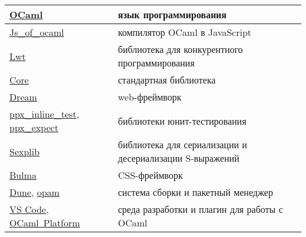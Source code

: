 \begin{centering}
\begin{longtable}{|l|p{8cm}|}
            \href{https://ocaml.org/}{OCaml}                                                                                                                    & язык программирования                                    \\ \hline
            \href{http://ocsigen.org/js_of_ocaml/}{Js\_of\_ocaml}                                                                                               & компилятор OCaml в JavaScript                            \\ \hline
            \href{https://ocsigen.org/lwt/}{Lwt}                                                                                                                & библиотека для конкурентного программирования            \\ \hline
            \href{https://opensource.janestreet.com/core/}{Core}                                                                                                & стандартная библиотека                                   \\ \hline
            \href{https://aantron.github.io/dream/}{Dream}                                                                                                      & web-фреймворк                                            \\ \hline
            \href{https://github.com/janestreet/ppx_inline_test}{ppx\_inline\_test}, \href{https://github.com/janestreet/ppx_expect}{ppx\_expect}               & библиотеки юнит-тестирования                             \\ \hline
            \href{https://github.com/janestreet/sexplib}{Sexplib}                                                                                               & библиотека для сериализации и десериализации S-выражений \\ \hline
            \href{https://bulma.io/}{Bulma}                                                                                                                     & CSS-фреймворк                                            \\ \hline
            \href{https://dune.build/}{Dune}, \href{https://opam.ocaml.org/}{opam}                                                                              & система сборки и пакетный менеджер                       \\ \hline
            \href{https://code.visualstudio.com/}{VS Code}, \href{https://marketplace.visualstudio.com/items?itemName=ocamllabs.ocaml-platform}{OCaml~Platform} & среда разработки и плагин для работы с OCaml             \\ \hline
      \end{longtable}
\end{centering}
